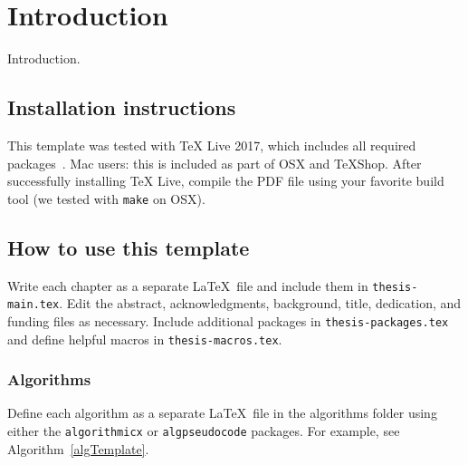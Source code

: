 
\chapter{Introduction} \label{secIntro}

Introduction.

\section{Installation instructions}

This template was tested with TeX Live 2017, which includes all required packages~\cite{TUG2017}. Mac users: this is included as part of OSX and TeXShop. After successfully installing TeX Live, compile the PDF file using your favorite build tool (we tested with \verb!make! on OSX).

\section{How to use this template}
Write each chapter as a separate \LaTeX\ file and include them in \verb!thesis-main.tex!. Edit the abstract, acknowledgments, background, title, dedication, and funding files as necessary. Include additional packages in \verb!thesis-packages.tex! and define helpful macros in \verb!thesis-macros.tex!.

\subsection{Algorithms}
Define each algorithm as a separate \LaTeX\ file in the algorithms folder using either the \verb!algorithmicx! or \verb!algpseudocode! packages. For example, see Algorithm~\ref{algTemplate}.



